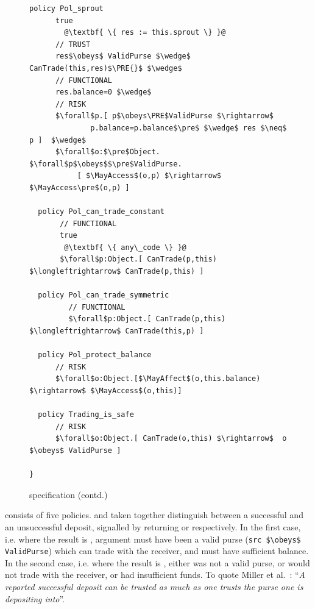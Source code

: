 \begin{figure}[htb]
\begin{lstlisting}[escapechar=@,firstnumber=32]
  policy Pol_sprout
      true
        @\textbf{ \{ res := this.sprout \} }@
      // TRUST
      res$\obeys$ ValidPurse $\wedge$  CanTrade(this,res)$\PRE{}$ $\wedge$
      // FUNCTIONAL  
      res.balance=0 $\wedge$
      // RISK
      $\forall$p.[ p$\obeys\PRE$ValidPurse $\rightarrow$
              p.balance=p.balance$\pre$ $\wedge$ res $\neq$ p ]  $\wedge$
      $\forall$o:$\pre$Object. $\forall$p$\obeys$$\pre$ValidPurse.
           [ $\MayAccess$(o,p) $\rightarrow$ $\MayAccess\pre$(o,p) ]

  policy Pol_can_trade_constant
       // FUNCTIONAL
       true
        @\textbf{ \{ any\_code \} }@
       $\forall$p:Object.[ CanTrade(p,this) $\longleftrightarrow$ CanTrade(p,this) ]

  policy Pol_can_trade_symmetric
         // FUNCTIONAL
         $\forall$p:Object.[ CanTrade(p,this) $\longleftrightarrow$ CanTrade(this,p) ]

  policy Pol_protect_balance
      // RISK
      $\forall$o:Object.[$\MayAffect$(o,this.balance) $\rightarrow$ $\MayAccess$(o,this)]

  policy Trading_is_safe
      // RISK
      $\forall$o:Object.[ CanTrade(o,this) $\rightarrow$  o $\obeys$ ValidPurse ]

}
\end{lstlisting}
\vspace*{-7mm}
\caption{ specification (contd.)}
\end{figure}

\newcommand{\sophiabullet}{}

 consists of five policies. %
\sophiabullet {}  and \sophiabullet {} taken together  distinguish between
a successful and an unsuccessful deposit, signalled by
returning  or  respectively. In the first case, i.e. 
where the result is ,
argument   must have been
a valid purse
%
(\lstinline+src $\obeys$ ValidPurse+)
%
which can trade with the receiver,
 and  must have sufficient balance. In the second case, i.e. 
where the result is ,
 either  was not a valid purse,
or would not trade with the receiver, or had insufficient
funds.
To quote Miller et al.~\cite{ELang}:
``\textit{A reported successful deposit can be trusted as much as one
  trusts the purse one is depositing into}''.


